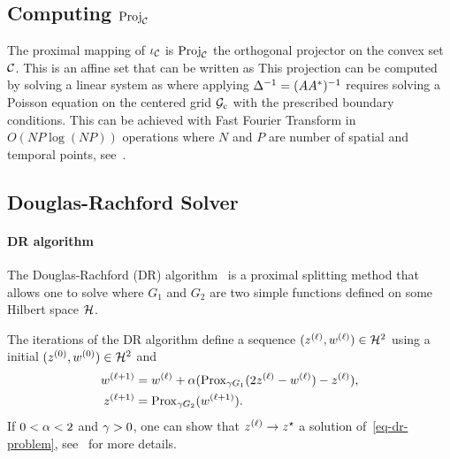 \subsection{Computing $\operatorname{Proj}_{\mathcal{C}}$}

The proximal mapping of $\iota_{\mathcal{C}}$ is $\operatorname{Proj}_{\mathcal{C}}$ the orthogonal projector on the convex set $\mathcal{C}$. This is an affine set that can be written as 
This projection can be computed by solving a linear system as
where applying $\Delta^{-1} = (AA^*)^{-1}$ requires solving a Poisson equation on the centered grid $\mathcal{G}_{\text{c}}$ with the prescribed boundary conditions. This can be achieved with Fast Fourier Transform in $O(NP \log(NP))$ operations where $N$ and $P$ are number of spatial and temporal points, see~\cite{Strang1988}. 


\subsection{Douglas-Rachford Solver}
\label{DR-algo}

\paragraph{DR algorithm}

The Douglas-Rachford (DR) algorithm~\cite{Lions-Mercier-DR} is a proximal splitting method that allows one to solve
where $G_1$ and $G_2$ are two simple functions defined on some Hilbert space $\mathcal{H}$.

The iterations of the DR algorithm define a sequence $({z}^{(\ell)}, {w}^{(\ell)}) \in \mathcal{H}^2$ using a initial $(z^{(0)}, w^{(0)})\in \mathcal{H}^2$ and 
\begin{equation}\label{eq-dr-iters}
\begin{aligned}
	\iiter{w} &=\iter{w} + \al (\prox_{\ga G_1} (2\iter{z}-\iter{w})-\iter{z}),\\
\iiter{z} &= \prox_{\ga G_2}(\iiter{w}).
\end{aligned}
\end{equation}
If $0 < \alpha < 2$ and $\gamma > 0$, one can show that ${z}^{(\ell)} \rightarrow z^\star$ a solution of~\eqref{eq-dr-problem}, see~\cite{Combettes2007} for more details. 

